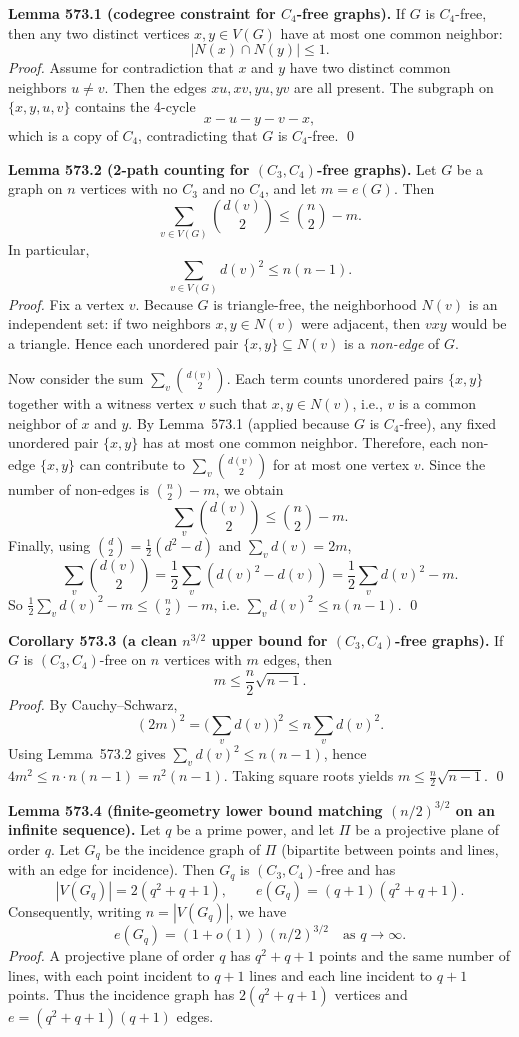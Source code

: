 \medskip
\textbf{Lemma 573.1 (codegree constraint for $C_4$-free graphs).}
If $G$ is $C_4$-free, then any two distinct vertices $x,y\in V(G)$ have at most one common neighbor:
\[
|N(x)\cap N(y)|\le 1.
\]
\emph{Proof.}
Assume for contradiction that $x$ and $y$ have two distinct common neighbors $u\ne v$. Then the edges $xu,xv,yu,yv$ are all present. The subgraph on $\{x,y,u,v\}$ contains the 4-cycle
\[
 x-u-y-v-x,
\]
which is a copy of $C_4$, contradicting that $G$ is $C_4$-free. \qed

\medskip
\textbf{Lemma 573.2 (2-path counting for $(C_3,C_4)$-free graphs).}
Let $G$ be a graph on $n$ vertices with no $C_3$ and no $C_4$, and let $m=e(G)$. Then
\[
\sum_{v\in V(G)} \binom{d(v)}{2}\le \binom{n}{2}-m.
\]
In particular,
\[
\sum_{v\in V(G)} d(v)^2 \le n(n-1).
\]
\emph{Proof.}
Fix a vertex $v$. Because $G$ is triangle-free, the neighborhood $N(v)$ is an independent set: if two neighbors $x,y\in N(v)$ were adjacent, then $vxy$ would be a triangle.
Hence each unordered pair $\{x,y\}\subseteq N(v)$ is a \emph{non-edge} of $G$.

Now consider the sum $\sum_v \binom{d(v)}{2}$. Each term counts unordered pairs $\{x,y\}$ together with a witness vertex $v$ such that $x,y\in N(v)$, i.e., $v$ is a common neighbor of $x$ and $y$.
By Lemma~573.1 (applied because $G$ is $C_4$-free), any fixed unordered pair $\{x,y\}$ has at most one common neighbor. Therefore, each non-edge $\{x,y\}$ can contribute to $\sum_v \binom{d(v)}{2}$ for at most one vertex $v$.
Since the number of non-edges is $\binom{n}{2}-m$, we obtain
\[
\sum_{v} \binom{d(v)}{2} \le \binom{n}{2}-m.
\]
Finally, using $\binom{d}{2}=\tfrac12(d^2-d)$ and $\sum_v d(v)=2m$,
\[
\sum_v \binom{d(v)}{2}=\frac12\sum_v(d(v)^2-d(v))=\frac12\sum_v d(v)^2 - m.
\]
So $\frac12\sum_v d(v)^2 - m \le \binom{n}{2}-m$, i.e.
$\sum_v d(v)^2\le n(n-1)$.
\qed

\medskip
\textbf{Corollary 573.3 (a clean $n^{3/2}$ upper bound for $(C_3,C_4)$-free graphs).}
If $G$ is $(C_3,C_4)$-free on $n$ vertices with $m$ edges, then
\[
m\le \frac{n}{2}\sqrt{n-1}.
\]
\emph{Proof.}
By Cauchy--Schwarz,
\[
(2m)^2=\Big(\sum_v d(v)\Big)^2 \le n\sum_v d(v)^2.
\]
Using Lemma~573.2 gives $\sum_v d(v)^2\le n(n-1)$, hence
$4m^2\le n\cdot n(n-1)=n^2(n-1)$.
Taking square roots yields $m\le \tfrac{n}{2}\sqrt{n-1}$.
\qed

\medskip
\textbf{Lemma 573.4 (finite-geometry lower bound matching $(n/2)^{3/2}$ on an infinite sequence).}
Let $q$ be a prime power, and let $\Pi$ be a projective plane of order $q$.
Let $G_q$ be the incidence graph of $\Pi$ (bipartite between points and lines, with an edge for incidence).
Then $G_q$ is $(C_3,C_4)$-free and has
\[
|V(G_q)|=2(q^2+q+1),\qquad e(G_q)=(q+1)(q^2+q+1).
\]
Consequently, writing $n=|V(G_q)|$, we have
\[
 e(G_q)=(1+o(1))(n/2)^{3/2} \quad\text{as }q\to\infty.
\]
\emph{Proof.}
A projective plane of order $q$ has $q^2+q+1$ points and the same number of lines, with each point incident to $q+1$ lines and each line incident to $q+1$ points.
Thus the incidence graph has $2(q^2+q+1)$ vertices and
$e=(q^2+q+1)(q+1)$ edges.

